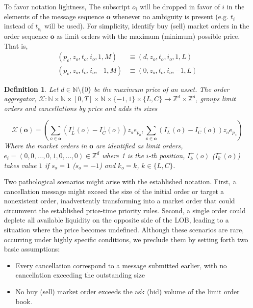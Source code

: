 \documentclass[10pt,a4paper,oneside]{article}
\newcommand{\N}{\mathbb{N}}
\newcommand{\Z}{\mathbb{Z}}
\newtheorem{definition}{Definition}
\begin{document}
To favor notation lightness, The subscript $o_i$ will be dropped in favor of $i$ in the elements of the message sequence $\mathbf{o}$ whenever no ambiguity is present (e.g. $t_i$ instead of $t_{o_i}$ will be used). For simplicity, identify buy (sell) market orders in the order sequence $\mathbf{o}$ as limit orders with the maximum (minimum) possible price. That is, 
\begin{align*}
    (p_o, z_o, t_o, i_o, 1,  M) &\equiv (d, z_o, t_o, i_o, 1, L) \\
    (p_o, z_o, t_o, i_o, -1, M) &\equiv (0, z_o, t_o, i_o, -1, L)
\end{align*}


\begin{definition}
Let $d \in \N \setminus \{ 0 \}$ be the maximum price of an asset. The order aggregator, $\mathcal{X} : \N \times \N \times [0, T] \times \N \times \{-1, 1 \} \times \{ L, C\} \rightarrow \Z^d \times \Z^d$, groups limit orders and cancellations by price and adds its sizes
    
$$
\mathcal{X}(\mathbf{o}) = \left( \sum_{o \in \mathbf{o}} (I^+_L(o) - I^+_C(o)) z_o e_{p_o}, \sum_{o \in \mathbf{o}} (I^-_L(o) - I^-_C(o)) z_o e_{p_o} \right)
$$
Where the market orders in $\mathbf{o}$ are identified as limit orders, $e_i = (0, 0, \dots, 0, 1, 0, \dots, 0) \in \Z^d$ where 1 is the $i$-th position, $I^+_k(o)$ ($I^-_k(o)$) takes value $1$ if $s_o = 1$ ($s_o = -1$) and $k_o = k$, $k \in \{ L, C\}$.
\label{def:order_aggregator}
\end{definition}


Two pathological scenarios might arise with the established notation. First, a cancellation message might exceed the size of the initial order or target a nonexistent order, inadvertently transforming into a market order that could circumvent the established price-time priority rules. Second, a single order could deplete all available liquidity on the opposite side of the LOB, leading to a situation where the price becomes undefined. Although these scenarios are rare, occurring under highly specific conditions, we preclude them by setting forth two basic assumptions:

\begin{itemize}
    \item[(A1)] Every cancellation correspond to a message submitted earlier, with no cancellation exceeding the outstanding size 
    \item[(A2)] No buy (sell) market order exceeds the ask (bid) volume of the limit order book.
\end{itemize}
\end{document}

